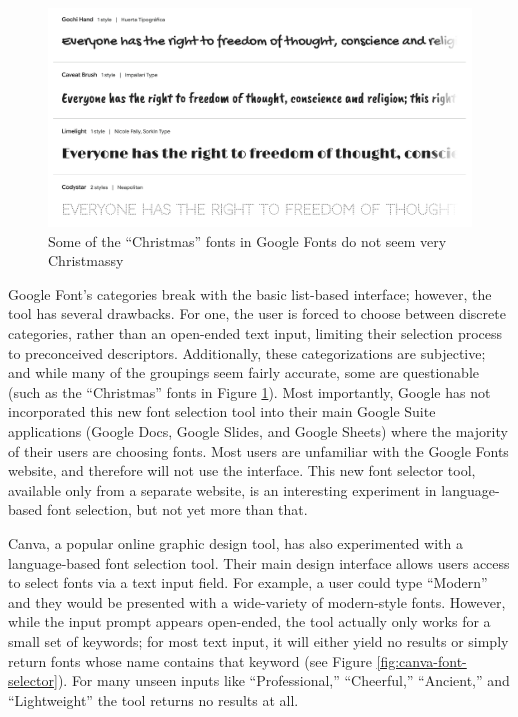 \begin{figure}
    \centering
    \includegraphics[width=1\textwidth]{images/google-fonts-christmas.png}
    \caption{Some of the ``Christmas'' fonts in Google Fonts do not seem very Christmassy}
    \label{fig:google-fonts-christmas}
\end{figure}

Google Font's categories break with the basic list-based interface; however, the tool has several drawbacks. For one, the user is forced to choose between discrete categories, rather than an open-ended text input, limiting their selection process to preconceived descriptors. Additionally, these categorizations are subjective; and while many of the groupings seem fairly accurate, some are questionable (such as the ``Christmas'' fonts in Figure \ref{fig:google-fonts-christmas}). Most importantly, Google has not incorporated this new font selection tool into their main Google Suite applications (Google Docs, Google Slides, and Google Sheets) where the majority of their users are choosing fonts. Most users are unfamiliar with the Google Fonts website, and therefore will not use the interface. This new font selector tool, available only from a separate website, is an interesting experiment in language-based font selection, but not yet more than that.

Canva, a popular online graphic design tool, has also experimented with a language-based font selection tool. Their main design interface allows users access to select fonts via a text input field. For example, a user could type ``Modern'' and they would be presented with a wide-variety of modern-style fonts. However, while the input prompt appears open-ended, the tool actually only works for a small set of keywords; for most text input, it will either yield no results or simply return fonts whose name contains that keyword (see Figure \ref{fig:canva-font-selector}). For many unseen inputs like ``Professional,'' ``Cheerful,'' ``Ancient,'' and ``Lightweight'' the tool returns no results at all.


